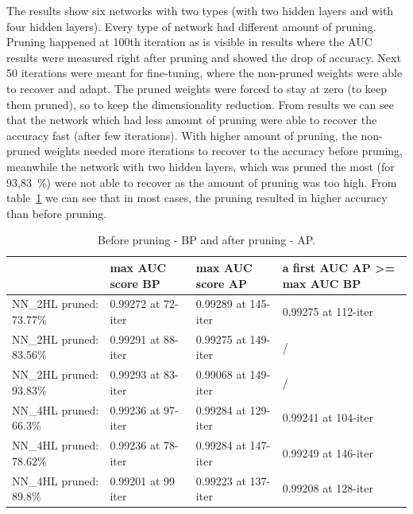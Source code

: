 \documentclass{article} %
\begin{document}
The results show six networks with two types (with two hidden layers and with 
four hidden layers). Every type of network had different amount of pruning. 
Pruning happened at 100th iteration as is visible in results where the AUC 
results were measured right after pruning and showed the drop of accuracy. Next 
50 iterations were meant for fine-tuning, where the non-pruned weights were able 
to recover and adapt. The pruned weights were forced to stay at zero (to keep 
them pruned), so to keep the dimensionality reduction. From results we can see 
that the network which had less amount of pruning were able to recover the 
accuracy fast (after few iterations). With higher amount of pruning, 
the non-pruned weights needed more iterations to recover to the accuracy before 
pruning, meanwhile the network with two hidden layers, which was pruned the most 
(for 93,83~\%) were not able to recover as the amount of pruning was too high.
From table~\ref{t:results} we can see that in most cases, the pruning resulted
in higher accuracy than before pruning. 


\begin{table}[!ht]
\centering
\begin{tabular}{l|l|l|p{3cm}|}
\cline{2-4}
 & max AUC score BP & max AUC score AP & a first AUC AP \textgreater= max AUC BP \\ \hline
\multicolumn{1}{|l|}{NN\_2HL pruned: 73.77\%} & 0.99272 at 72-iter & 0.99289 at 145-iter & 0.99275 at 112-iter \\ \hline
\multicolumn{1}{|l|}{NN\_2HL pruned: 83.56\%} & 0.99291 at 88-iter & 0.99275 at 149-iter & / \\ \hline
\multicolumn{1}{|l|}{NN\_2HL pruned: 93.83\%} & 0.99293 at 83-iter & 0.99068 at 149-iter & / \\ \hline
\multicolumn{1}{|l|}{NN\_4HL pruned: 66.3\%} & 0.99236 at 97-iter & 0.99284 at 129-iter & 0.99241 at 104-iter \\ \hline
\multicolumn{1}{|l|}{NN\_4HL pruned: 78.62\%} & 0.99236 at 78-iter & 0.99284 at 147-iter & 0.99249 at 146-iter \\ \hline
\multicolumn{1}{|l|}{NN\_4HL pruned: 89.8\%} & 0.99201 at 99 iter & 0.99223 at 137-iter & 0.99208 at 128-iter \\ \hline
\end{tabular}
\caption{Before pruning - BP and after pruning - AP.}
\label{t:results}
\end{table}
\end{document}
